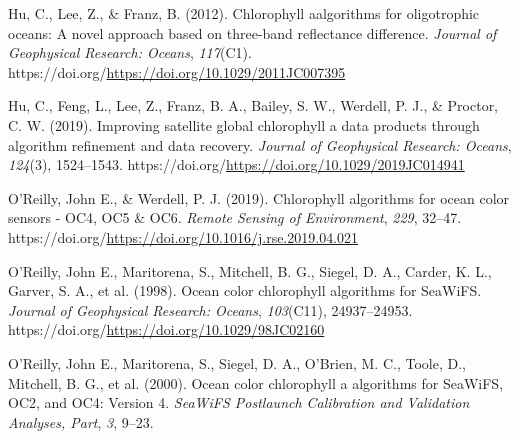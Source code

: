\documentclass[
]{agujournal2019}
\newlength{\cslhangindent}
\newenvironment{CSLReferences}[2] %
 {\begin{list}{}{%
  \setlength{\itemindent}{0pt}
  \setlength{\leftmargin}{0pt}
  \setlength{\parsep}{0pt}
  \ifodd #1
   \setlength{\leftmargin}{\cslhangindent}
   \setlength{\itemindent}{-1\cslhangindent}
  \fi
  \setlength{\itemsep}{#2\baselineskip}}}
 {\end{list}}
\begin{document}
\label{refs}
\begin{CSLReferences}{1}{0}
\vspace{1em}

Hu, C., Lee, Z., \& Franz, B. (2012). Chlorophyll aalgorithms for
oligotrophic oceans: A novel approach based on three-band reflectance
difference. \emph{Journal of Geophysical Research: Oceans},
\emph{117}(C1).
https://doi.org/\url{https://doi.org/10.1029/2011JC007395}

Hu, C., Feng, L., Lee, Z., Franz, B. A., Bailey, S. W., Werdell, P. J.,
\& Proctor, C. W. (2019). Improving satellite global chlorophyll a data
products through algorithm refinement and data recovery. \emph{Journal
of Geophysical Research: Oceans}, \emph{124}(3), 1524--1543.
https://doi.org/\url{https://doi.org/10.1029/2019JC014941}

O'Reilly, John E., \& Werdell, P. J. (2019). Chlorophyll algorithms for
ocean color sensors - OC4, OC5 \& OC6. \emph{Remote Sensing of
Environment}, \emph{229}, 32--47.
https://doi.org/\url{https://doi.org/10.1016/j.rse.2019.04.021}

O'Reilly, John E., Maritorena, S., Mitchell, B. G., Siegel, D. A.,
Carder, K. L., Garver, S. A., et al. (1998). Ocean color chlorophyll
algorithms for SeaWiFS. \emph{Journal of Geophysical Research: Oceans},
\emph{103}(C11), 24937--24953.
https://doi.org/\url{https://doi.org/10.1029/98JC02160}

O'Reilly, John E., Maritorena, S., Siegel, D. A., O'Brien, M. C., Toole,
D., Mitchell, B. G., et al. (2000). Ocean color chlorophyll a algorithms
for SeaWiFS, OC2, and OC4: Version 4. \emph{SeaWiFS Postlaunch
Calibration and Validation Analyses, Part}, \emph{3}, 9--23.

\end{CSLReferences}
\end{document}
